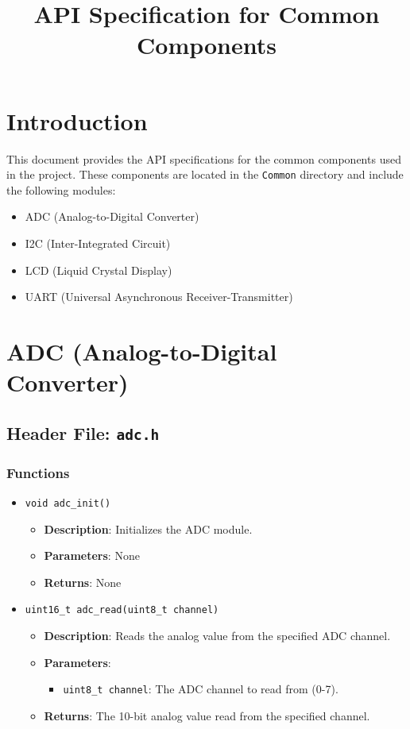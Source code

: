 \documentclass{article}
\begin{document}
\title{API Specification for Common Components}
\author{}
\date{}
\maketitle

\section{Introduction}
This document provides the API specifications for the common components used in the project. These components are located in the \texttt{Common} directory and include the following modules:
\begin{itemize}
   \item ADC (Analog-to-Digital Converter)
   \item I2C (Inter-Integrated Circuit)
   \item LCD (Liquid Crystal Display)
   \item UART (Universal Asynchronous Receiver-Transmitter)
\end{itemize}

\section{ADC (Analog-to-Digital Converter)}

\subsection{Header File: \texttt{adc.h}}

\subsubsection{Functions}

\begin{itemize}
   \item \texttt{void adc\_init()}
   \begin{itemize}
      \item \textbf{Description}: Initializes the ADC module.
      \item \textbf{Parameters}: None
      \item \textbf{Returns}: None
   \end{itemize}

   \item \texttt{uint16\_t adc\_read(uint8\_t channel)}
   \begin{itemize}
      \item \textbf{Description}: Reads the analog value from the specified ADC channel.
      \item \textbf{Parameters}:
      \begin{itemize}
         \item \texttt{uint8\_t channel}: The ADC channel to read from (0-7).
      \end{itemize}
      \item \textbf{Returns}: The 10-bit analog value read from the specified channel.
   \end{itemize}
\end{itemize}
\end{document}
